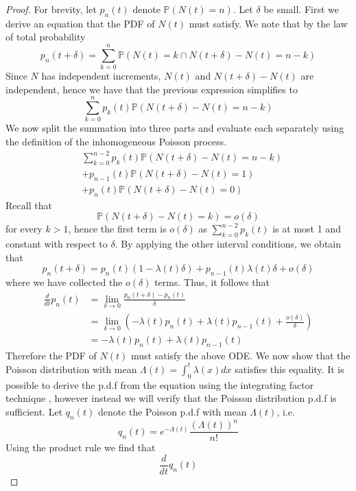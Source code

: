 \begin{proof}
	For brevity, let $p_n(t)$ denote $\mathbb{P}(N(t) = n)$. Let $\delta$ be small.
	First we derive an equation that the PDF of $N(t)$ must satisfy.
	We note that by the law of total probability
	$$
		p_n(t+\delta) = \sum_{k=0}^n \mathbb{P}(N(t) = k \cap N(t + \delta) - N(t) = n - k) 
	$$
	Since $N$ has independent increments, $N(t)$ and $N(t + \delta) - N(t)$ are independent, hence we have that the previous expression simplifies to
	$$
		\sum_{k=0}^n p_k(t) \mathbb{P}(N(t + \delta) - N(t) = n - k) 
	$$
	We now split the summation into three parts and evaluate each separately using the definition of the inhomogeneous Poisson process.
	\begin{align*}
		&\sum_{k=0}^{n-2} p_k(t) \mathbb{P}(N(t + \delta) - N(t) = n - k) \\ 
		&+ p_{n-1}(t) \mathbb{P}(N(t + \delta) - N(t) = 1) \\
		&+ p_n(t) \mathbb{P}(N(t + \delta) - N(t) = 0) 
	\end{align*}
	Recall that
	$$
		\mathbb{P}(N(t + \delta) - N(t) = k) 
		= o(\delta)
	$$
	for every $k > 1$, hence the first term is $o(\delta)$ as $\sum_{k=0}^{n-2} p_k(t)$ is at most 1 and constant with respect to $\delta$.  
	By applying the other interval conditions, we obtain that
	$$
		p_n(t+\delta) = p_n(t)(1-\lambda(t)\delta) + p_{n-1}(t)\lambda(t)\delta + o(\delta)
	$$
	where we have collected the $o(\delta)$ terms.
	Thus, it follows that
	\begin{align*}
		\frac{d}{dt} p_n(t) 
		&= \lim_{\delta \to 0} \frac{p_n(t+\delta) - p_n(t)}{\delta} \\
		&= \lim_{\delta \to 0} \left( -\lambda(t)p_n(t) + \lambda(t)p_{n-1}(t) + \frac{o(\delta)}{\delta} \right)\\
		&= -\lambda(t)p_n(t) + \lambda(t)p_{n-1}(t)
	\end{align*}
	Therefore the PDF of $N(t)$ must satisfy the above ODE. 
	We now show that the Poisson distribution with mean $\Lambda(t) = \int_0^t \lambda(x) dx$
	satisfies this equality. It is possible to derive the p.d.f from the equation using the integrating factor technique \cite{inhomoPoissonProof}, however instead we will verify that the Poisson distribution p.d.f is sufficient.
	Let $q_n(t)$ denote the Poisson p.d.f with mean $\Lambda(t)$, i.e.
	$$
		q_n(t)
		= e^{-\Lambda (t)}\frac{(\Lambda(t))^n}{n!}
	$$
	Using the product rule we find that 
	$$
		\frac{d}{dt} q_n(t) 
$$
\end{proof}
